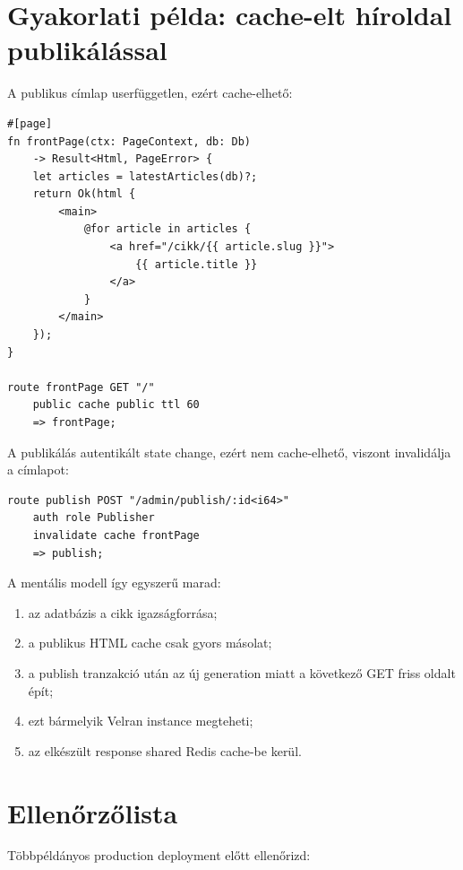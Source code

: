 \section{Gyakorlati példa: cache-elt híroldal publikálással}

A publikus címlap userfüggetlen, ezért cache-elhető:

\begin{lstlisting}[language=Velran]
#[page]
fn frontPage(ctx: PageContext, db: Db)
    -> Result<Html, PageError> {
    let articles = latestArticles(db)?;
    return Ok(html {
        <main>
            @for article in articles {
                <a href="/cikk/{{ article.slug }}">
                    {{ article.title }}
                </a>
            }
        </main>
    });
}

route frontPage GET "/"
    public cache public ttl 60
    => frontPage;
\end{lstlisting}

A publikálás autentikált state change, ezért nem cache-elhető, viszont invalidálja a címlapot:

\begin{lstlisting}[language=Velran]
route publish POST "/admin/publish/:id<i64>"
    auth role Publisher
    invalidate cache frontPage
    => publish;
\end{lstlisting}

A mentális modell így egyszerű marad:

\begin{enumerate}
  \item az adatbázis a cikk igazságforrása;
  \item a publikus HTML cache csak gyors másolat;
  \item a publish tranzakció után az új generation miatt a következő GET friss oldalt épít;
  \item ezt bármelyik Velran instance megteheti;
  \item az elkészült response shared Redis cache-be kerül.
\end{enumerate}

\section{Ellenőrzőlista}

Többpéldányos production deployment előtt ellenőrizd:

